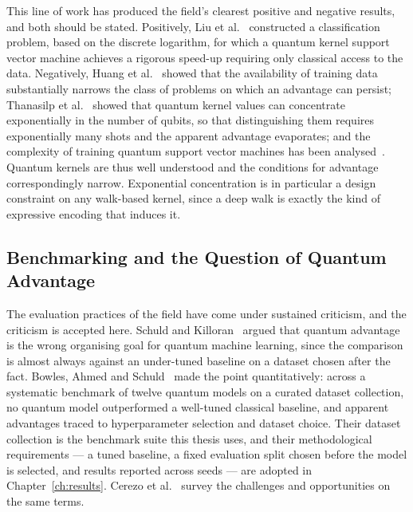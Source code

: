 This line of work has produced the field's clearest positive and negative
results, and both should be stated. Positively, Liu et al.~\cite{Liu_2020}
constructed a classification problem, based on the discrete logarithm, for which
a quantum kernel support vector machine achieves a rigorous speed-up requiring
only classical access to the data. Negatively, Huang et al.~\cite{Huang_2021}
showed that the availability of training data substantially narrows the class of
problems on which an advantage can persist; Thanasilp et
al.~\cite{Thanasilp_2024} showed that quantum kernel values can concentrate
exponentially in the number of qubits, so that distinguishing them requires
exponentially many shots and the apparent advantage evaporates; and the
complexity of training quantum support vector machines has been
analysed~\cite{Gentinetta_2022}. Quantum kernels are thus well understood and
the conditions for advantage correspondingly narrow. Exponential concentration
is in particular a design constraint on any walk-based kernel, since a deep walk
is exactly the kind of expressive encoding that induces it.

\subsection{Benchmarking and the Question of Quantum Advantage}
\label{sec:lr-bench}
The evaluation practices of the field have come under sustained criticism, and
the criticism is accepted here. Schuld and Killoran~\cite{Schuld_2022} argued
that quantum advantage is the wrong organising goal for quantum machine
learning, since the comparison is almost always against an under-tuned baseline
on a dataset chosen after the fact. Bowles, Ahmed and Schuld~\cite{Bowles_2024}
made the point quantitatively: across a systematic benchmark of twelve quantum
models on a curated dataset collection, no quantum model outperformed a
well-tuned classical baseline, and apparent advantages traced to hyperparameter
selection and dataset choice. Their dataset collection is the benchmark suite
this thesis uses, and their methodological requirements --- a tuned baseline, a
fixed evaluation split chosen before the model is selected, and results reported
across seeds --- are adopted in Chapter~\ref{ch:results}. Cerezo et
al.~\cite{Cerezo2022} survey the challenges and opportunities on the same terms.

